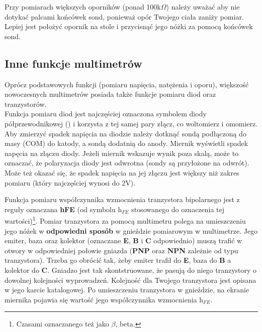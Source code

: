 Przy pomiarach większych oporników (ponad 100k$\Omega$) należy uważać aby nie dotykać palcami końcówek sond, ponieważ opór Twojego ciała
zaniży pomiar. Lepiej jest położyć opornik na stole i przycisnąć jego nóżki za pomocą końcówek sond.


\subsection{Inne funkcje multimetrów}
Oprócz podstawowych funkcji (pomiaru napięcia, natężenia i oporu)\footnotemark, większość nowoczesnych multimetrów posiada także funkcje pomiaru diod oraz tranzystorów.
\\

Funkcja pomiaru diod jest najczęściej oznaczona symbolem diody półprzewodnikowej () i korzysta z tej samej pary złącz, co woltomierz i omomierz.
Aby zmierzyć spadek napięcia na diodzie należy dotknąć sondą podłączoną do masy (COM) do katody, a sondą dodatnią do anody. Miernik wyświetli
spadek napęcia na złączu diody. Jeżeli miernik wskazuje wynik poza skalą, może to oznaczać, że polaryzacja diody jest odwrotna (sondy są przyłożone na odwrót).
Może też okazać się, że spadek napięcia na jej złączu jest większy niż zakres pomiaru (który najczęściej wynosi do 2V).
\\


Funkcja pomiaru współczynnika wzmocnienia tranzystora bipolarnego jest z reguły oznaczana \textbf{hFE} (od symbolu $\text{h}_{FE}$ stosowanego do
oznaczenia tej wartości)\footnote{Czasami oznaczanego też jako $\beta$, beta.}. Pomiar tranzystora za pomocą multimetru polega na umieszczeniu jego nóżek w \textbf{odpowiedni sposób} w gnieździe pomiarowym
w multimetrze. Jego emiter, baza oraz kolektor (oznaczane \textbf{E}, \textbf{B} i \textbf{C} odpowiednio) muszą trafić w
otwory w odpowiedniej połowie gniazda (\textbf{PNP} oraz \textbf{NPN} zależnie od typu tranzystora). Trzeba go obrócić tak, żeby emiter trafił do \textbf{E}, baza do \textbf{B} a kolektor do \textbf{C}. Gniadzo jest tak skontstruowane, że
pasują do niego tranzystory o dowolnej kolejności wyprowadzeń. Kolejność dla Twojego tranzystora jest opisana w jego karcie katalogowej.
Po umieszczeniu tranzystora w gnieździe, na ekranie miernika pojawia się wartość jego współczynnika wzmocnienia $\text{h}_{FE}$.
\\

